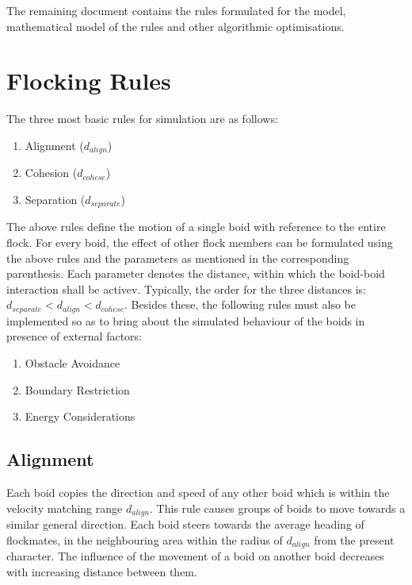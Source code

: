 \documentclass[12pt]{report}
\begin{document}
The remaining document contains the rules formulated for the model, mathematical model of the rules and other algorithmic optimisations.

\newpage
\section*{Flocking Rules}
The three most basic rules for simulation are as follows:
\begin{enumerate}
\item Alignment ($d_{align}$)
\item Cohesion ($d_{cohese}$)
\item Separation ($d_{separate}$)
\end{enumerate}
The above rules define the motion of a single boid with reference to the entire flock.
For every boid, the effect of other flock members can be formulated using the above rules and the parameters as mentioned in the corresponding parenthesis.  
\newline
Each parameter denotes the distance, within which the boid-boid interaction shall be activev. Typically, the order for the three distances is:  $d_{separate} < d_{align} < d_{cohese}$.
\newline
Besides these, the following rules must also be implemented so as to bring about the simulated behaviour of the boids in presence of external factors:
\begin{enumerate}
\item Obstacle Avoidance
\item Boundary Restriction
\item Energy Considerations
\end{enumerate}


\subsection*{Alignment}
Each boid copies the direction and speed of any other boid which is within the velocity matching range  
$d_{align}$. This rule causes groups of boids to move towards a similar general direction. Each boid steers towards the average heading of flockmates, in the neighbouring area within the radius of $d_{align}$ from the present character.
\newline
The influence of the movement of a boid on another boid decreases with increasing distance between them. 
\end{document}
